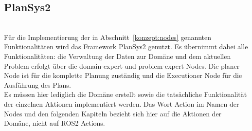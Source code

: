 \subsection{PlanSys2}~\cite{plansys}\\
Für die Implementierung der in Abschnitt~\ref{konzept:nodes} genannten Funktionalitäten wird das Framework \ac{PlanSys2} genutzt.
Es übernimmt dabei alle Funktionalitäten: die Verwaltung der Daten zur Domäne und dem aktuellen Problem erfolgt über die domain-expert und problem-expert Nodes.
Die planer Node ist für die komplette Planung zuständig und die Executioner Node für die Ausführung des Plans.\\
Es müssen hier lediglich die Domäne erstellt sowie die tatsächliche Funktionalität der einzelnen Aktionen implementiert werden.
Das Wort Action im Namen der Nodes und den folgenden Kapiteln bezieht sich hier auf die Aktionen der Domäne, nicht auf \ac{ROS2} Actions.



